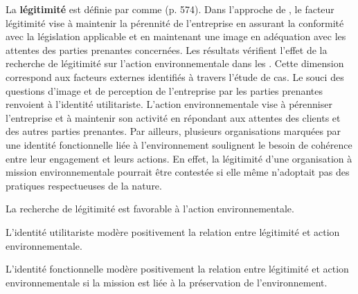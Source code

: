         La \textbf{légitimité} est définie par \textcite{suchman1995managing} comme  (p. 574). Dans l'approche de \textcite{bansal2000why}, le facteur légitimité vise à maintenir la pérennité de l'entreprise en assurant la conformité avec la législation applicable et en maintenant une image en adéquation avec les attentes des parties prenantes concernées. Les résultats vérifient l'effet de la recherche de légitimité sur l'action environnementale dans les \eess. Cette dimension correspond aux facteurs externes identifiés à travers l'étude de cas. Le souci des questions d'image et de perception de l'entreprise par les parties prenantes renvoient à l'identité utilitariste. L'action environnementale vise à pérenniser l'entreprise et à maintenir son activité en répondant aux attentes des clients et des autres parties prenantes. Par ailleurs, plusieurs organisations marquées par une identité fonctionnelle liée à l'environnement soulignent le besoin de cohérence entre leur engagement et leurs actions. En effet, la légitimité d'une organisation à mission environnementale pourrait être contestée si elle même n'adoptait pas des pratiques respectueuses de la nature.

        \begin{hyp}
        \label{prop:DET2a}
            La recherche de légitimité est favorable à l'action environnementale.
        \end{hyp}

        \begin{hyp}
        \label{prop:DET2b}
            L'identité utilitariste modère positivement la relation entre légitimité et action environnementale.
        \end{hyp}

        \begin{hyp}
        \label{prop:DET2c}
            L'identité fonctionnelle modère positivement la relation entre légitimité et action environnementale si la mission est liée à la préservation de l'environnement.
        \end{hyp}

